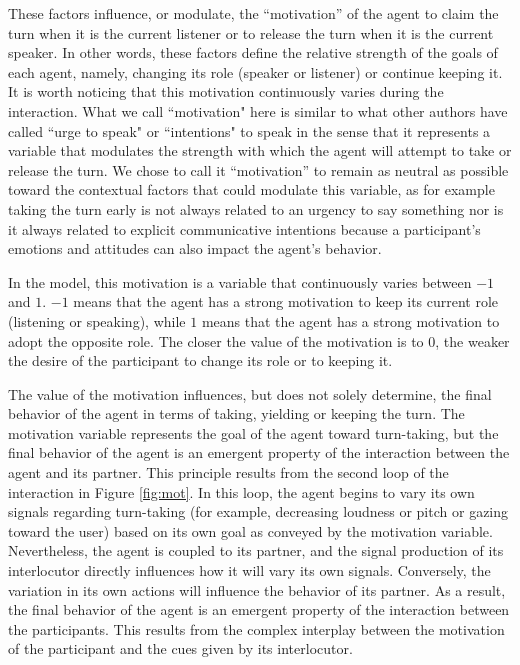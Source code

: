 \documentclass[twocolumn]{svjour3}
\begin{document}
These factors influence, or modulate, the ``motivation'' of the agent to claim the turn when it is the current listener or to release the turn when it is the current speaker. 
In other words, these factors define the relative strength of the goals of each agent, namely, changing its role (speaker or listener) or continue keeping it. It is worth noticing that this motivation continuously varies during the interaction. 
What we call ``motivation" here is similar to what other authors have called ``urge to speak" \citep{thorisson_multiparty_2010} or ``intentions"  to speak \citep{lessmann_towards_2004} in the sense that it represents a variable that modulates the strength with which the agent will attempt to take or release the turn. We chose to call it ``motivation'' to remain as neutral as possible toward the contextual factors that could modulate this variable, as for example taking the turn early is not always related to an urgency to say something nor is it always related to explicit communicative intentions because a participant's emotions and attitudes can also impact the agent's behavior. 

In the  model, this motivation is a variable that continuously varies between $-1$ and $1$. 
$-1$ means that the agent has a strong motivation to keep its current role (listening or speaking), while $1$ means that the agent has a strong motivation to adopt the opposite role. 
The closer the value of the motivation is to $0$, the weaker the desire of the participant to change its role or to keeping it. 

The value of the motivation influences, but does not solely determine, the final behavior of the agent in terms of taking, yielding or keeping the turn. The motivation variable represents the goal of the agent toward turn-taking, but the final behavior of the agent is an emergent property of the interaction between the agent and its partner. 
This principle results from the second loop of the interaction in Figure \ref{fig:mot}. 
In this loop, the agent begins to vary its own signals regarding turn-taking (for example, decreasing loudness or pitch or gazing toward the user) based on its own goal as conveyed by the motivation variable. Nevertheless, the agent is coupled to its partner, and the signal production of its interlocutor directly influences how it will vary its own signals.
Conversely, the variation in its own actions will influence the behavior of its partner. 
As a result, the final behavior of the agent is an emergent property of the interaction between the participants.
This results from the complex interplay between the motivation of the participant and the cues given by its interlocutor.
\end{document}
